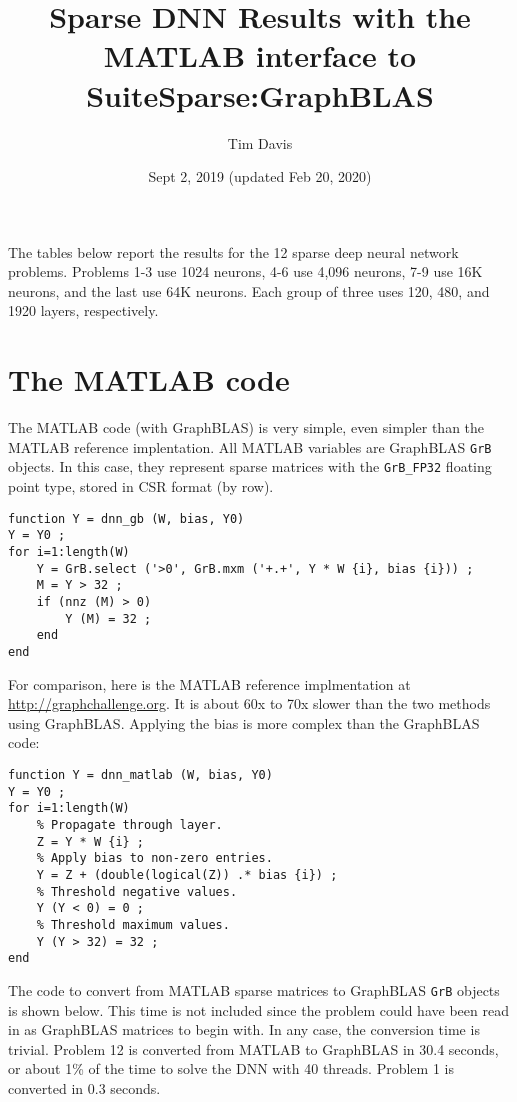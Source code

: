 \documentclass[12pt]{article}
\title{Sparse DNN Results with the MATLAB interface to SuiteSparse:GraphBLAS}
\author{Tim Davis}
\date{Sept 2, 2019 (updated Feb 20, 2020)}
\begin{document}
\maketitle

The tables below report the results for the 12 sparse deep neural network
problems.  Problems 1-3 use 1024 neurons, 4-6 use 4,096 neurons, 7-9 use 16K
neurons, and the last use 64K neurons.  Each group of three uses 120, 480, and
1920 layers, respectively.

\section{The MATLAB code}

The MATLAB code (with GraphBLAS) is very simple, even simpler than the MATLAB
reference implentation.  All MATLAB variables are GraphBLAS \verb'GrB' objects.
In this case, they represent sparse matrices with the \verb'GrB_FP32' floating
point type, stored in CSR format (by row).

{\footnotesize
\begin{verbatim}
function Y = dnn_gb (W, bias, Y0)
Y = Y0 ;
for i=1:length(W)
    Y = GrB.select ('>0', GrB.mxm ('+.+', Y * W {i}, bias {i})) ;
    M = Y > 32 ;
    if (nnz (M) > 0)
        Y (M) = 32 ;
    end
end
\end{verbatim}}

For comparison, here is the MATLAB reference implmentation at \newline
\url{http://graphchallenge.org}.  It is about 60x to 70x slower than the two
methods using GraphBLAS.  Applying the bias is more complex than the GraphBLAS
code:

{\footnotesize
\begin{verbatim}
function Y = dnn_matlab (W, bias, Y0)
Y = Y0 ;
for i=1:length(W)
    % Propagate through layer.
    Z = Y * W {i} ;
    % Apply bias to non-zero entries.
    Y = Z + (double(logical(Z)) .* bias {i}) ;
    % Threshold negative values.
    Y (Y < 0) = 0 ;
    % Threshold maximum values.
    Y (Y > 32) = 32 ;
end
\end{verbatim}}

The code to convert from MATLAB sparse matrices to GraphBLAS \verb'GrB' objects
is shown below.  This time is not included since the problem could have been
read in as GraphBLAS matrices to begin with.  In any case, the conversion time
is trivial.  Problem 12 is converted from MATLAB to GraphBLAS in 30.4 seconds,
or about 1\% of the time to solve the DNN with 40 threads.  Problem 1 is
converted in 0.3 seconds.
\end{document}
